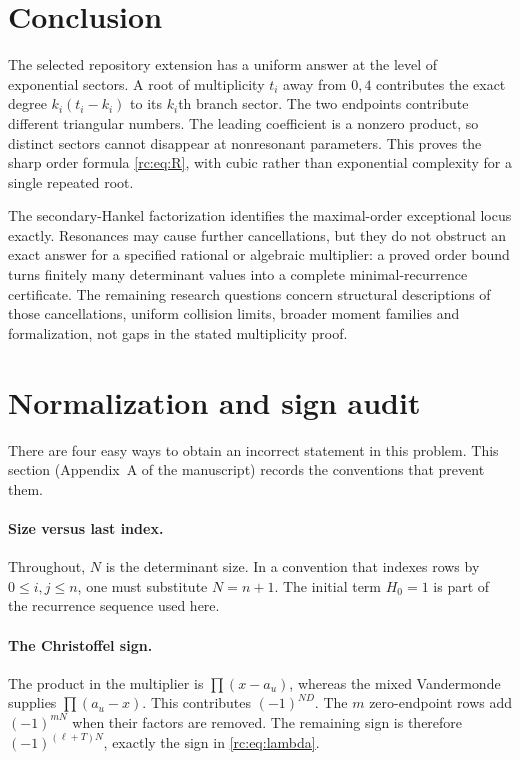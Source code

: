 \documentclass[11pt,a4paper]{article}
\numberwithin{equation}{section}
\theoremstyle{definition}
\theoremstyle{remark}
\begin{document}
\section{Conclusion}\label{rc:sec:conclusion}
The selected repository extension has a uniform answer at the level of
exponential sectors.  A root of multiplicity $t_i$ away from $0,4$
contributes the exact degree $k_i(t_i-k_i)$ to its $k_i$th branch sector.
The two endpoints contribute different triangular numbers.  The leading
coefficient is a nonzero product, so distinct sectors cannot disappear
at nonresonant parameters.  This proves the sharp order formula
\eqref{rc:eq:R}, with cubic rather than exponential complexity for a single
repeated root.

The secondary-Hankel factorization identifies the maximal-order
exceptional locus exactly.  Resonances may cause further cancellations,
but they do not obstruct an exact answer for a specified rational or
algebraic multiplier: a proved order bound turns finitely many determinant
values into a complete minimal-recurrence certificate.  The remaining
research questions concern structural descriptions of those cancellations,
uniform collision limits, broader moment families and formalization,
not gaps in the stated multiplicity proof.

\section{Normalization and sign audit}\label{rc:app:audit}

There are four easy ways to obtain an incorrect statement in this problem.
This section (Appendix~A of the manuscript) records the conventions that
prevent them.

\paragraph{Size versus last index.}
Throughout, $N$ is the determinant size.  In a convention that indexes
rows by $0\le i,j\le n$, one must substitute $N=n+1$.  The initial
term $H_0=1$ is part of the recurrence sequence used here.

\paragraph{The Christoffel sign.}
The product in the multiplier is $\prod(x-a_u)$, whereas the mixed
Vandermonde supplies $\prod(a_u-x)$.  This contributes $(-1)^{ND}$.
The $m$ zero-endpoint rows add $(-1)^{mN}$ when their factors are
removed.  The remaining sign is therefore $(-1)^{(\ell+T)N}$,
exactly the sign in \eqref{rc:eq:lambda}.
\end{document}
